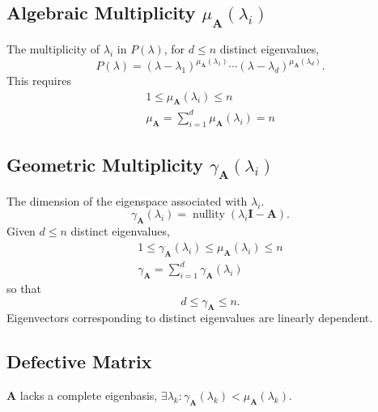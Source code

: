 \documentclass{article}
\DeclareMathOperator*{\nullity}{nullity}
\begin{document}
\begin{multicols*}{3}
    \subsection{Algebraic Multiplicity \texorpdfstring{\(\mu_{\symbf{A}}\left( \lambda_i \right)\)}{mu(lambda i)}}
    The multiplicity of \(\lambda_i\) in \(P(\lambda)\),
    for \(d \leq n\) distinct eigenvalues,
    \begin{equation*}
        P\left( \lambda \right) = \left( \lambda - \lambda_1 \right)^{\mu_{\symbf{A}}\left( \lambda_1 \right)} \cdots \left( \lambda - \lambda_d \right)^{\mu_{\symbf{A}}\left( \lambda_d \right)}.
    \end{equation*}
    This requires
    \begin{gather*}
        1 \leq \mu_{\symbf{A}}\left( \lambda_i \right) \leq n         \\
        \mu_{\symbf{A}} = \sum_{i = 1}^d \mu_{\symbf{A}} \left( \lambda_i \right) = n
    \end{gather*}
    \subsection{Geometric Multiplicity \texorpdfstring{\(\gamma_{\symbf{A}}\left( \lambda_i \right)\)}{gamma(lambda i)}}
    The dimension of the eigenspace associated with \(\lambda_i\).
    \begin{equation*}
        \gamma_{\symbf{A}} \left( \lambda_i \right) = \nullity{\left( \lambda_i \symbf{I} - \symbf{A} \right)}.
    \end{equation*}
    Given \(d \leq n\) distinct eigenvalues,
    \begin{gather*}
        1 \leq \gamma_{\symbf{A}}\left( \lambda_i \right) \leq \mu_{\symbf{A}}\left( \lambda_i \right) \leq n \\
        \gamma_{\symbf{A}} = \sum_{i = 1}^d \gamma_{\symbf{A}} \left( \lambda_i \right)
    \end{gather*}
    so that
    \begin{equation*}
        d \leq \gamma_{\symbf{A}} \leq n.
    \end{equation*}
    Eigenvectors corresponding to distinct eigenvalues are linearly dependent.
    \subsection{Defective Matrix}
    \(\symbf{A}\) lacks a complete eigenbasis, \(\exists \lambda_k : \gamma_{\symbf{A}}\left( \lambda_k \right) < \mu_{\symbf{A}}\left( \lambda_k \right)\).

\end{multicols*}
\end{document}
